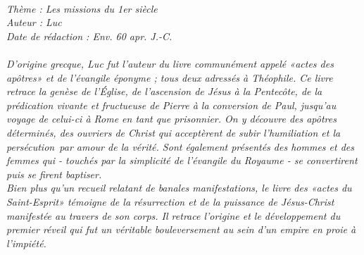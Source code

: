 \BFont
\noindent\hrulefill
\textit{
\bigskip
{\centering{}
\\Thème : Les missions du 1er siècle
\\Auteur : Luc
\\Date de rédaction : Env. 60 apr. J.-C.\\}
}
\textit{
\\D’origine grecque, Luc fut l’auteur du livre communément appelé «actes des apôtres» et de l’évangile éponyme ; tous deux adressés à Théophile. Ce livre retrace la genèse de l’Église, de l’ascension de Jésus à la Pentecôte, de la prédication vivante et fructueuse de Pierre à la conversion de Paul, jusqu’au voyage de celui-ci à Rome en tant que prisonnier. On y découvre des apôtres déterminés, des ouvriers de Christ qui acceptèrent de subir l’humiliation et la persécution par amour de la vérité. Sont également présentés des hommes et des femmes qui - touchés par la simplicité de l’évangile du Royaume - se convertirent puis se firent baptiser.
\bigskip
\\Bien plus qu’un recueil relatant de banales manifestations, le livre des «actes du Saint-Esprit» témoigne de la résurrection et de la puissance de Jésus-Christ manifestée au travers de son corps. Il retrace l’origine et le développement du premier réveil qui fut un véritable bouleversement au sein d’un empire en proie à l’impiété.\bigskip
}
\par\nobreak\noindent\hrulefill
